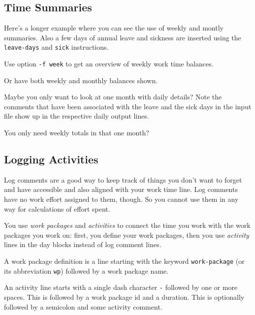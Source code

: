 \documentclass[11pt]{article}
\begin{document}


\subsection{Time Summaries}

Here's a longer example where you can see the use of weekly and montly summaries. Also a few days of annual leave and sickness are inserted using the \verb:leave-days: and \verb:sick: instructions.



Use option \verb:-f week: to get an overview of weekly work time balances.



Or have both weekly and monthly balances shown.



Maybe you only want to look at one month with daily details? Note the comments that have been associated with the leave and the sick days in the input file show up in the respective daily output lines.



You only need weekly totals in that one month?



\subsection{Logging Activities}

Log comments are a good way to keep track of things you don't want to forget and have accessible and also aligned with your work time line. Log comments have no work effort assigned to them, though. So you cannot use them in any way for calculations of effort spent.

You use \emph{work packages} and \emph{activities} to connect the time you work with the work packages you work on: first, you define your work packages, then you use \emph{activity} lines in the day blocks instead of log comment lines.

A work package definition is a line starting with the keyword \verb:work-package: (or its abbreviation \verb:wp:) followed by a work package name.

An activity line starts with a single dash character \verb:-: followed by one or more spaces. This is followed by a work package id and a duration. This is optionally followed by a semicolon and some activity comment.
\end{document}
